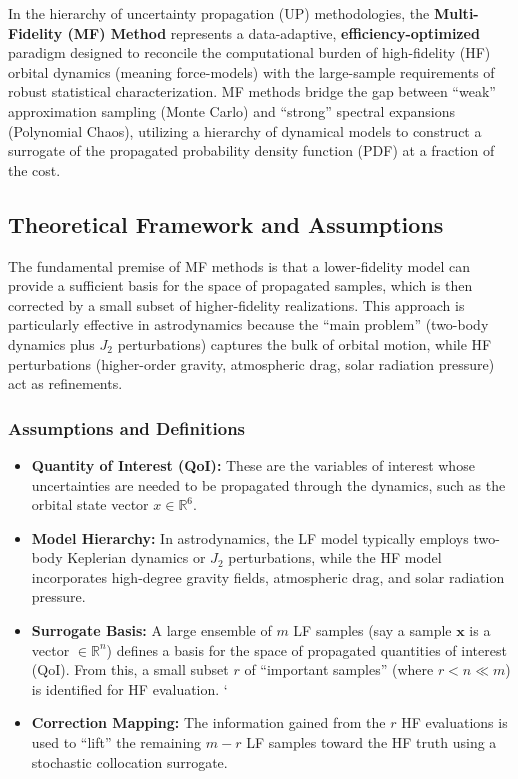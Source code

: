 \documentclass[
  letterpaper,
  DIV=11,
  numbers=noendperiod,
  oneside]{scrartcl}
\begin{document}
In the hierarchy of uncertainty propagation (UP) methodologies, the
\textbf{Multi-Fidelity (MF) Method} represents a data-adaptive,
\textbf{efficiency-optimized} paradigm designed to reconcile the
computational burden of high-fidelity (HF) orbital dynamics (meaning
force-models) with the large-sample requirements of robust statistical
characterization. MF methods bridge the gap between ``weak''
approximation sampling (Monte Carlo) and ``strong'' spectral expansions
(Polynomial Chaos), utilizing a hierarchy of dynamical models to
construct a surrogate of the propagated probability density function
(PDF) at a fraction of the cost.

\subsection{Theoretical Framework and
Assumptions}\label{sec-mf-assumptions}

The fundamental premise of MF methods is that a lower-fidelity model can
provide a sufficient basis for the space of propagated samples, which is
then corrected by a small subset of higher-fidelity realizations. This
approach is particularly effective in astrodynamics because the ``main
problem'' (two-body dynamics plus \(J_2\) perturbations) captures the
bulk of orbital motion, while HF perturbations (higher-order gravity,
atmospheric drag, solar radiation pressure) act as refinements.

\subsubsection{Assumptions and
Definitions}\label{assumptions-and-definitions}

\begin{itemize}
\item
  \textbf{Quantity of Interest (QoI):} These are the variables of
  interest whose uncertainties are needed to be propagated through the
  dynamics, such as the orbital state vector \(x \in \mathbb{R}^6\).
\item
  \textbf{Model Hierarchy:} In astrodynamics, the LF model typically
  employs two-body Keplerian dynamics or \(J_2\) perturbations, while
  the HF model incorporates high-degree gravity fields, atmospheric
  drag, and solar radiation pressure.
\item
  \textbf{Surrogate Basis:} A large ensemble of \(m\) LF samples (say a
  sample \(\mathbf{x}\) is a vector \(\in \mathbb{R}^n\)) defines a
  basis for the space of propagated quantities of interest (QoI). From
  this, a small subset \(r\) of ``important samples'' (where
  \(r < n \ll m\)) is identified for HF evaluation. `
\item
  \textbf{Correction Mapping:} The information gained from the \(r\) HF
  evaluations is used to ``lift'' the remaining \(m-r\) LF samples
  toward the HF truth using a stochastic collocation surrogate.
\end{itemize}
\end{document}
